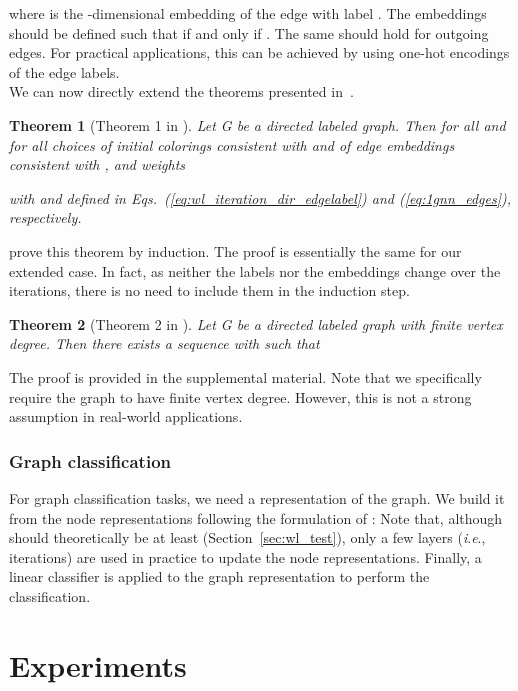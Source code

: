 \documentclass{article} \usepackage{iclr2019_conference,times}
\newtheorem{theorem}{Theorem}[section]
\newcommand{\ie}{\textit{i}.\textit{e}., }
\begin{document}
where  is the -dimensional embedding of the edge  with label . The embeddings  should be defined such that  if and only if . The same should hold for outgoing edges. For practical applications, this can be achieved by using one-hot encodings of the edge labels.\\
We can now directly extend the theorems presented in~\cite{Morris2018}.
\begin{theorem}[Theorem 1 in \cite{Morris2018}]\label{thm:at_most} Let G be a directed labeled graph. Then for all  and for all choices of initial colorings  consistent with  and of edge embeddings  consistent with , and weights 

with  and  defined in Eqs.~(\ref{eq:wl_iteration_dir_edgelabel}) and (\ref{eq:1gnn_edges}),  respectively. 
\end{theorem}
\cite{Morris2018} prove this theorem by induction. The proof is essentially the same for our extended case. In fact, as neither the labels  nor the embeddings  change over the iterations, there is no need to include them in the induction step.
\begin{theorem}[Theorem 2 in \cite{Morris2018}]\label{thm:exists} Let G be a directed labeled graph with finite vertex degree. Then there exists a sequence  with  such that

\end{theorem}

The proof is provided in the supplemental material. Note that we specifically require the graph to have finite vertex degree. However, this is not a strong assumption in real-world applications.

\subsubsection{Graph classification}

For graph classification tasks, we need a representation  of the graph. We build it from the node representations  following the formulation of \cite{Xu2018}:  
Note that, although   should theoretically be at least  (Section~\ref{sec:wl_test}), only a few layers (\ie iterations) are used in practice to update the node representations. Finally, a linear classifier is  applied to the graph representation to perform the classification.

\section{Experiments}
\end{document}
